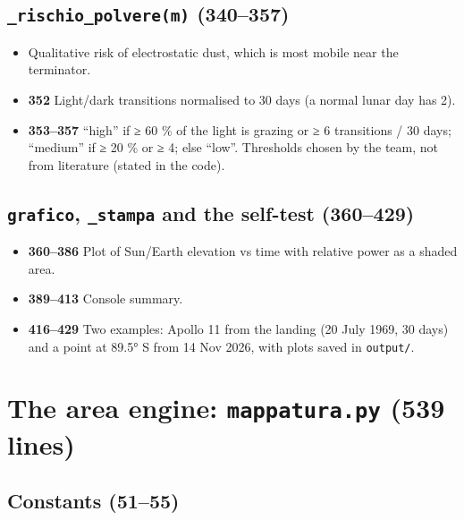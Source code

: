 \documentclass[11pt,a4paper]{article}
\providecommand{\tightlist}{\setlength{\itemsep}{0pt}\setlength{\parskip}{0pt}}
\begin{document}
\hypertarget{rischio_polverem-340357}{%
\subsection{\texorpdfstring{\texttt{\_rischio\_polvere(m)}
(340--357)}{\_rischio\_polvere(m) (340--357)}}\label{rischio_polverem-340357}}

\begin{itemize}
\tightlist
\item
  Qualitative risk of electrostatic dust, which is most mobile near the
  terminator.
\item
  \textbf{352} Light/dark transitions normalised to 30 days (a normal
  lunar day has 2).
\item
  \textbf{353--357} ``high'' if ≥ 60 \% of the light is grazing or ≥ 6
  transitions / 30 days; ``medium'' if ≥ 20 \% or ≥ 4; else ``low''.
  Thresholds chosen by the team, not from literature (stated in the
  code).
\end{itemize}

\hypertarget{grafico-_stampa-and-the-self-test-360429}{%
\subsection{\texorpdfstring{\texttt{grafico}, \texttt{\_stampa} and the
self-test
(360--429)}{grafico, \_stampa and the self-test (360--429)}}\label{grafico-_stampa-and-the-self-test-360429}}

\begin{itemize}
\tightlist
\item
  \textbf{360--386} Plot of Sun/Earth elevation vs time with relative
  power as a shaded area.
\item
  \textbf{389--413} Console summary.
\item
  \textbf{416--429} Two examples: Apollo 11 from the landing (20 July
  1969, 30 days) and a point at 89.5° S from 14 Nov 2026, with plots
  saved in \texttt{output/}.
\end{itemize}

\hypertarget{the-area-engine-mappatura.py-539-lines}{%
\section{\texorpdfstring{The area engine: \texttt{mappatura.py} (539
lines)}{The area engine: mappatura.py (539 lines)}}\label{the-area-engine-mappatura.py-539-lines}}

\hypertarget{constants-5155}{%
\subsection{Constants (51--55)}\label{constants-5155}}
\end{document}
